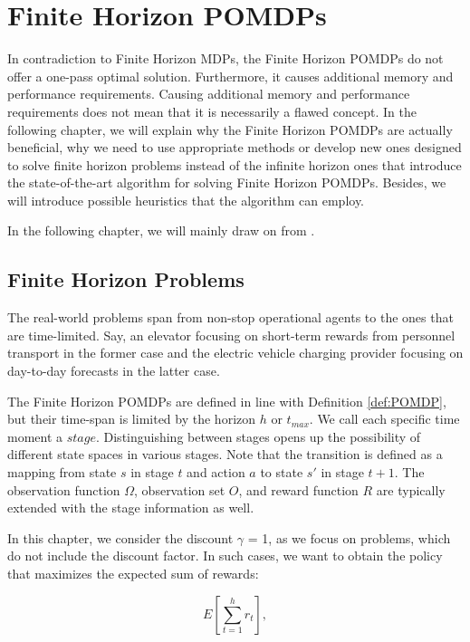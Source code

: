 


\chapter{Finite Horizon POMDPs}

 In contradiction to Finite Horizon MDPs, the Finite Horizon POMDPs do not offer a one-pass optimal solution. Furthermore, it causes additional memory and performance requirements.
 Causing additional memory and performance requirements does not mean that it is necessarily a flawed concept. In the following chapter, we will explain why the Finite Horizon POMDPs are actually beneficial, why we need to use appropriate methods or develop new ones designed to solve finite horizon problems instead of the infinite horizon ones that introduce the state-of-the-art algorithm for solving Finite Horizon POMDPs. Besides, we will introduce possible heuristics that the algorithm can employ.
 
 In the following chapter, we will mainly draw on from \cite{Walraven19}.
 
 
 \section{Finite Horizon Problems}
 The real-world problems span from non-stop operational agents to the ones that are time-limited. Say, an elevator focusing on short-term rewards from personnel transport in the former case and the electric vehicle charging provider focusing on day-to-day forecasts in the latter case.
 
 The Finite Horizon POMDPs are defined in line with Definition \ref{def:POMDP}, but their time-span is limited by the horizon $h$ or $t_{max}$. We call each specific time moment a $stage$. Distinguishing between stages opens up the possibility of different state spaces in various stages. Note that the transition is defined as a mapping from state $s$ in stage $t$ and action $a$ to state $s'$ in stage $t+1$. The observation function $\Omega$, observation set $O$, and reward function $R$ are typically extended with the stage information as well.
 
In this chapter, we consider the discount $\gamma$ = 1, as we focus on problems, which do not include the discount factor. In such cases, we want to obtain the policy that maximizes the expected sum of rewards:

\begin{equation}
    E \left[ \sum_{t=1}^{h}r_t \right],
\end{equation}


